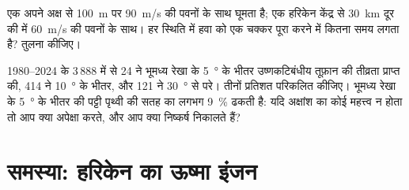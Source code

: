 \begin{exercise}[$\star\star\star$]\label{exo:g10:storms-and-cyclones:14}
एक  अपने अक्ष से \qty{100}{m} पर \qty{90}{m/s} की पवनों के साथ घूमता है;
एक हरिकेन केंद्र से \qty{30}{km} दूर की  में \qty{60}{m/s} की
पवनों के साथ। हर स्थिति में हवा को एक चक्कर पूरा करने में कितना समय लगता है? तुलना कीजिए।
\end{exercise}

\begin{exercise}[$\star\star\star$]\label{exo:g10:storms-and-cyclones:15}
1980--2024 के 3\,888  में से 24 ने भूमध्य रेखा के
\qty{5}{\degree} के भीतर उष्णकटिबंधीय तूफ़ान की तीव्रता प्राप्त की, 414 ने
\qty{10}{\degree} के भीतर, और 121 ने \qty{30}{\degree} से परे। तीनों
प्रतिशत परिकलित कीजिए। भूमध्य रेखा के \qty{5}{\degree} के भीतर की पट्टी पृथ्वी की
सतह का लगभग \qty{9}{\percent} ढकती है: यदि अक्षांश का कोई महत्त्व न होता तो
आप क्या अपेक्षा करते, और आप क्या निष्कर्ष निकालते हैं?
\end{exercise}

\section{समस्या: हरिकेन का ऊष्मा इंजन}

